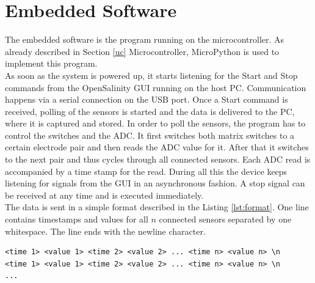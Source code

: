 \section{Embedded Software}

The embedded software is the program running on the microcontroller. As already described in Section \ref{uc} Microcontroller, MicroPython is used to implement this program.\\

As soon as the system is powered up, it starts listening for the Start and Stop commands from the OpenSalinity GUI running on the host PC. Communication happens via a serial connection on the USB port. Once a Start command is received, polling of the sensors is started and the data is delivered to the PC, where it is captured and stored.
In order to poll the sensors, the program has to control the switches and the ADC. It first switches both matrix switches to a certain electrode pair and then reads the ADC value for it. After that it switches to the next pair and thus cycles through all connected sensors. Each ADC read is accompanied by a time stamp for the read. During all this the device keeps listening for signals from the GUI in an asynchronous fashion. A stop signal can be received at any time and is executed immediately.\\

The data is sent in a simple format described in the Listing \ref{lst:format}. One line contains timestamps and values for all $n$ connected sensors separated by one whitespace. The line ends with the newline character.

\begin{lstlisting}[caption={The data format contains timestamps and values seperated by a whitespace.},label={lst:format}]
<time 1> <value 1> <time 2> <value 2> ... <time n> <value n> \n
<time 1> <value 1> <time 2> <value 2> ... <time n> <value n> \n
...
\end{lstlisting}

